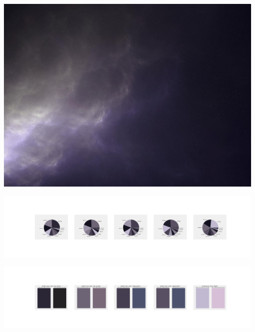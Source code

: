 \documentclass[11pt]{article}
\begin{document}
\begin{landscape}
    \begin{center}
    \includegraphics[width=\textwidth]{./nbimg/file (168).jpg}
    \end{center}

    \begin{center}
    \includegraphics[width=250mm]{./nbimg/pie-76.jpg}
    \end{center}

    \begin{center}
    \includegraphics[width=250mm]{./nbimg/peak-76.jpg}
    \end{center}
    


\end{landscape}
\end{document}
